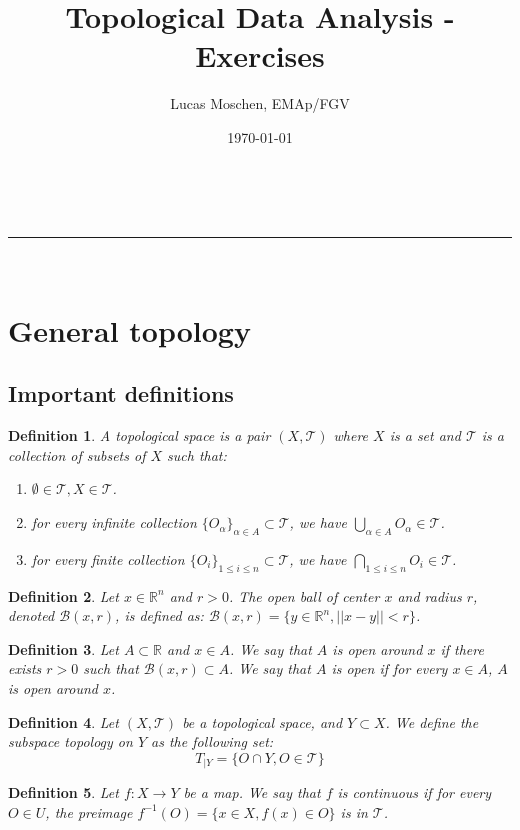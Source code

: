 \documentclass[a4paper,11pt]{article}
\title{Topological Data Analysis - Exercises}
\author{Lucas Moschen, EMAp/FGV}
\date{\today}
\makeatletter
\newcommand{\linia}{\rule{\linewidth}{0.5pt}}
\theoremstyle{mytheor}
\newtheorem{definition}{Definition}[subsection]
\theoremstyle{mytheor}
\theoremstyle{remark}
\newcommand{\T}{\mathcal{T}}
\newcommand{\B}{\mathcal{B}}
\newcommand{\R}{\mathbb{R}}
\renewcommand{\maketitle}{
    \begin{center}
        \vspace{2ex}
        {\huge \textsc{\@title}}
        \vspace{1ex}
        \\
        \linia\\
        \@author \hfill \@date
        \vspace{4ex}
    \end{center}
}
\makeatother
\begin{document}
\maketitle

\section{General topology}

\subsection{Important definitions}

\begin{definition}
    A topological space is a pair $(X, \T)$ where $X$ is a set and $\T$ is a
    collection of subsets of $X$ such that:
    \begin{enumerate}
        \item $\emptyset \in \T, X \in \T$. 
        \item for every infinite collection $\{O_{\alpha}\}_{\alpha \in A}\subset \T$, we have $\bigcup_{\alpha \in A} O_{\alpha} \in \T$.
        \item for every finite collection $\{O_{i}\}_{1 \le i \le n}
        \subset \T$, we have $\bigcap_{1 \le i \le n} O_{i} \in \T$.
    \end{enumerate}   
\end{definition}

\begin{definition}
    Let $x \in \R^n$ and $r > 0$. The open ball of center $x$ and radius $r$,
    denoted $\B(x, r)$, is defined as: $\B(x, r) = \{y \in \R^n, ||x - y|| < r\}$.
\end{definition}

\begin{definition}
    Let $A \subset \R$ and $x \in A$. We say that $A$ is open
    around $x$ if there exists $r > 0$ such that $\B(x, r) \subset A$. We say
    that $A$ is open if for every $x \in A$, $A$ is open around $x$.
\end{definition}

\begin{definition}
    Let $(X, \T)$ be a topological space, and $Y \subset X$. We define the subspace topology on $Y$ as the following set:
    $$T_{|Y} = \{O \cap Y, O \in \T\}$$
\end{definition}

\begin{definition}
    Let $f : X \to Y$ be a map. We say that $f$ is continuous if for every
    $O \in U$, the preimage $f^{-1}(O) = \{x \in X, f(x) \in O\}$ is in $\T$.
\end{definition}
\end{document}
